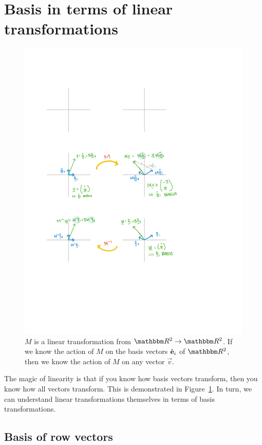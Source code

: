 \documentclass[12pt, oneside]{report}    %
\let\oldsection\section
\def\section{%
  \setcounter{sidenote}{1}%
  \oldsection
}
\begin{document}


\section{Basis in terms of linear transformations}

\begin{figure}[tb]
    \centering
    \includegraphics[width=.8\textwidth]{figures/maps_M.pdf}
    \caption{$M$ is a linear transformation from $\RR ^2\to\RR ^2$. If we know the action of $M$ on the basis vectors $\hat{\mathbf{e}}_i$ of $\RR ^2$, then we know the action of $M$ on any vector $\vec{v}$.}
    \label{fig:map:M}
\end{figure}

The magic of linearity is that if you know how basis vectors transform, then you know how all vectors transform. This is demonstrated in Figure~\ref{fig:map:M}. In turn, we can understand linear transformations themselves in terms of basis transformations.

\subsection{Basis of row vectors}
\end{document}
